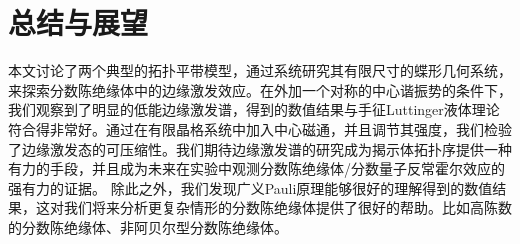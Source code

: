 \chapter{总结与展望}
\label{summary}

本文讨论了两个典型的拓扑平带模型，通过系统研究其有限尺寸的蝶形几何系统，来探索分数陈绝缘体中的边缘激发效应。在外加一个对称的中心谐振势的条件下，我们观察到了明显的低能边缘激发谱，得到的数值结果与手征Luttinger液体理论符合得非常好。通过在有限晶格系统中加入中心磁通，并且调节其强度，我们检验了边缘激发态的可压缩性。我们期待边缘激发谱的研究成为揭示体拓扑序提供一种有力的手段，并且成为未来在实验中观测分数陈绝缘体/分数量子反常霍尔效应的强有力的证据。
除此之外，我们发现广义Pauli原理能够很好的理解得到的数值结果，这对我们将来分析更复杂情形的分数陈绝缘体提供了很好的帮助。比如高陈数的分数陈绝缘体、非阿贝尔型分数陈绝缘体。
